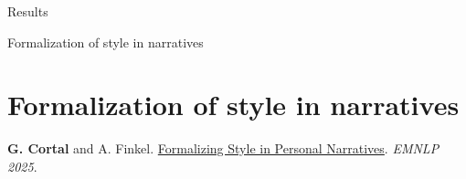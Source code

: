 \documentclass[handout,10pt]{beamer}
\begin{document}
\begin{frame}{Results}
\vspace{0.5cm}
\scriptsize




    
\end{frame}


\begin{frame}{}
\Large
\begin{center}
    Formalization of style in narratives
    \section{Formalization of style in narratives}
\end{center}

\vspace{1.5cm}

\footnotesize

\textbf{G. Cortal} and A. Finkel. \href{https://gustavecortal.com/data/Formalizing_Style_in_Personal_Narratives.pdf}{Formalizing Style in Personal Narratives}. \textit{EMNLP 2025}.
\end{frame}
\end{document}
